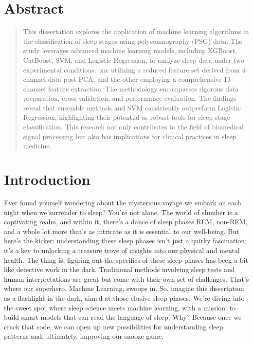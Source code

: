 \documentclass[12pt, a4paper,oneside]{book}
\numberwithin{equation}{section}
\begin{document}
\listoffigures
\listoftables
\chapter*{Abstract} %
\begin{abstract}
    This dissertation explores the application of machine learning algorithms in the classification of sleep stages using polysomnography (PSG) data. The study leverages advanced machine learning models, including XGBoost, CatBoost, SVM, and Logistic Regression, to analyze sleep data under two experimental conditions: one utilizing a reduced feature set derived from 4-channel data post-PCA, and the other employing a comprehensive 13-channel feature extraction. The methodology encompasses rigorous data preparation, cross-validation, and performance evaluation. The findings reveal that ensemble methods and SVM consistently outperform Logistic Regression, highlighting their potential as robust tools for sleep stage classification. This research not only contributes to the field of biomedical signal processing but also has implications for clinical practices in sleep medicine.
\end{abstract}
\chapter{Introduction}\label{ch:1}

Ever found yourself wondering about the mysterious voyage we embark on each night when we surrender to sleep? You're not alone. The world of slumber is a captivating realm, and within it, there's a dance of sleep phases REM, non-REM, and a whole lot more that's as intricate as it is essential to our well-being.
But here's the kicker: understanding these sleep phases isn't just a quirky fascination; it's a key to unlocking a treasure trove of insights into our physical and mental health. The thing is, figuring out the specifics of these sleep phases has been a bit like detective work in the dark. Traditional methods involving sleep tests and human interpretations are great but come with their own set of challenges. That's where our superhero, Machine Learning, swoops in.
So, imagine this dissertation as a flashlight in the dark, aimed at those elusive sleep phases. We're diving into the sweet spot where sleep science meets machine learning, with a mission: to build smart models that can read the language of sleep. Why? Because once we crack that code, we can open up new possibilities for understanding sleep patterns and, ultimately, improving our snooze game.
\end{document}
